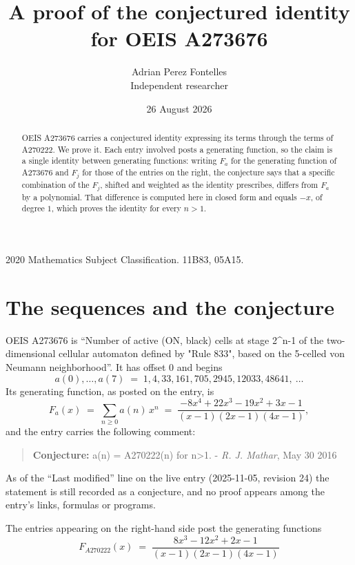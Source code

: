 \documentclass[11pt,a4paper]{article}
\title{A proof of the conjectured identity for OEIS A273676}
\author{Adrian Perez Fontelles\\ \small Independent researcher}
\date{26 August 2026}
\theoremstyle{plain}
\theoremstyle{definition}
\begin{document}
\maketitle

\begin{abstract}
OEIS A273676 carries a conjectured identity expressing its terms through the terms of
A270222. We prove it. Each entry involved posts a generating function, so the claim is
a single identity between generating functions: writing $F_{a}$ for the generating
function of A273676 and $F_{j}$ for those of the entries on the right, the conjecture
says that a specific combination of the $F_{j}$, shifted and weighted as the identity
prescribes, differs from $F_{a}$ by a polynomial. That difference is computed here in
closed form and equals $- x$, of degree $1$, which proves the identity for
every $n>1$.
\end{abstract}

\noindent\small 2020 Mathematics Subject Classification. 11B83, 05A15.\normalsize

\section{The sequences and the conjecture}

OEIS A273676 is ``Number of active (ON, black) cells at stage 2\^{}n-1 of the two-dimensional cellular automaton defined by "Rule 833", based on the 5-celled von Neumann neighborhood''. It has offset $0$ and begins
\[
a(0),\dots,a(7)\;=\;1, 4, 33, 161, 705, 2945, 12033, 48641,\ \dots
\]
Its generating function, as posted on the entry, is
\begin{equation}\label{eq:gf}
F_{a}(x)\;=\;\sum_{n\ge 0} a(n)\,x^{n}\;=\;\frac{- 8 x^{4} + 22 x^{3} - 19 x^{2} + 3 x - 1}{\left(x - 1\right) \left(2 x - 1\right) \left(4 x - 1\right)} ,
\end{equation}
and the entry carries the following comment:
\begin{quote}\small
\textbf{Conjecture:} a(n) = A270222(n) for n>1. - \emph{R. J. Mathar}, May 30 2016
\end{quote}
As of the ``Last modified'' line on the live entry (2025-11-05, revision 24) the
statement is still recorded as a conjecture, and no proof appears among the entry's links,
formulas or programs.

The entries appearing on the right-hand side post the generating functions
\[
F_{A270222}(x) \;=\; \frac{8 x^{3} - 12 x^{2} + 2 x - 1}{\left(x - 1\right) \left(2 x - 1\right) \left(4 x - 1\right)}
\]
\end{document}
